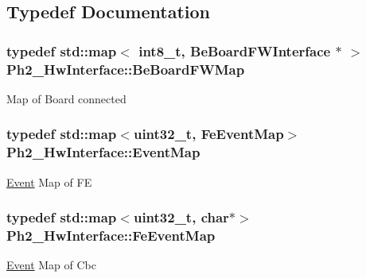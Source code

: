 \subsection{Typedef Documentation}
\hypertarget{namespace_ph2___hw_interface_ac35d341eb47fa7cbe4d28ccbc6ab4875}{
\subsubsection[{Be\-Board\-F\-W\-Map}]{\setlength{\rightskip}{0pt plus 5cm}typedef std\-::map$<$ int8\-\_\-t, {\bf Be\-Board\-F\-W\-Interface} $\ast$ $>$ {\bf Ph2\-\_\-\-Hw\-Interface\-::\-Be\-Board\-F\-W\-Map}}}\label{namespace_ph2___hw_interface_ac35d341eb47fa7cbe4d28ccbc6ab4875}
Map of Board connected \hypertarget{namespace_ph2___hw_interface_acf9f41d647e7a3ad9bae233b04b9e3bc}{
\subsubsection[{Event\-Map}]{\setlength{\rightskip}{0pt plus 5cm}typedef std\-::map$<$uint32\-\_\-t, {\bf Fe\-Event\-Map}$>$ {\bf Ph2\-\_\-\-Hw\-Interface\-::\-Event\-Map}}}\label{namespace_ph2___hw_interface_acf9f41d647e7a3ad9bae233b04b9e3bc}
\hyperlink{class_ph2___hw_interface_1_1_event}{Event} Map of F\-E \hypertarget{namespace_ph2___hw_interface_a50d97ee46941c2c0c2ecadc929e41b05}{
\subsubsection[{Fe\-Event\-Map}]{\setlength{\rightskip}{0pt plus 5cm}typedef std\-::map$<$uint32\-\_\-t, char$\ast$$>$ {\bf Ph2\-\_\-\-Hw\-Interface\-::\-Fe\-Event\-Map}}}\label{namespace_ph2___hw_interface_a50d97ee46941c2c0c2ecadc929e41b05}
\hyperlink{class_ph2___hw_interface_1_1_event}{Event} Map of Cbc 

